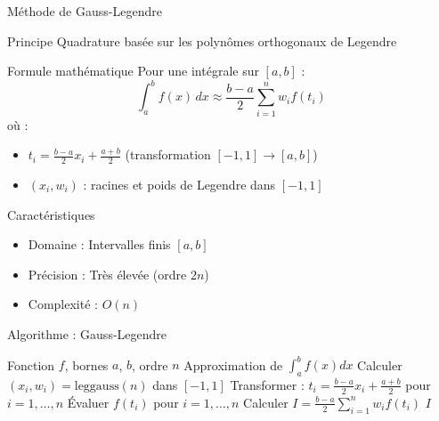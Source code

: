 \documentclass[aspectratio=169,11pt]{beamer}
\begin{document}
\begin{frame}{Méthode de Gauss-Legendre}
\vspace{-0.2cm}
\begin{block}{Principe}
\small Quadrature basée sur les polynômes orthogonaux de Legendre
\end{block}

\vspace{-0.15cm}
\begin{block}{Formule mathématique}
\small
Pour une intégrale sur $[a,b]$ :
\begin{equation}
\int_a^b f(x) \, dx \approx \frac{b-a}{2} \sum_{i=1}^n w_i f(t_i)
\end{equation}
où :
\begin{itemize}
\item $t_i = \frac{b-a}{2}x_i + \frac{a+b}{2}$ (transformation $[-1,1] \to [a,b]$)
\item $(x_i, w_i)$ : racines et poids de Legendre dans $[-1,1]$
\end{itemize}
\end{block}

\vspace{-0.15cm}
\begin{block}{Caractéristiques}
\small
\begin{itemize}
\item Domaine : Intervalles finis $[a,b]$
\item Précision : Très élevée (ordre $2n$)
\item Complexité : $O(n)$
\end{itemize}
\end{block}
\end{frame}

\begin{frame}{Algorithme : Gauss-Legendre}
\vspace{-0.3cm}
\begin{algorithm}[H]
\caption{Quadrature de Gauss-Legendre}
\small
\begin{algorithmic}[1]
\REQUIRE Fonction $f$, bornes $a$, $b$, ordre $n$
\ENSURE Approximation de $\int_a^b f(x) dx$
\STATE Calculer $(x_i, w_i) = \text{leggauss}(n)$ dans $[-1,1]$
\STATE Transformer : $t_i = \frac{b-a}{2}x_i + \frac{a+b}{2}$ pour $i=1,\ldots,n$
\STATE Évaluer $f(t_i)$ pour $i=1,\ldots,n$
\STATE Calculer $I = \frac{b-a}{2} \sum_{i=1}^n w_i f(t_i)$
\RETURN $I$
\end{algorithmic}
\end{algorithm}
\end{frame}
\end{document}
